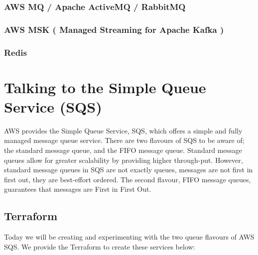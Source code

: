 \documentclass{csse4400}
\begin{document}
\subsubsection{AWS MQ / Apache ActiveMQ / RabbitMQ}


\subsubsection{AWS MSK ( Managed Streaming for Apache Kafka )}


\subsubsection{Redis}


\section{Talking to the Simple Queue Service (SQS)}

AWS provides the Simple Queue Service, SQS,
which offers a simple and fully managed message queue service.
There are two flavours of SQS to be aware of;
the standard message queue, and the FIFO message queue.
Standard message queues allow for greater scalability by providing higher through-put.
However, standard message queues in SQS are not exactly queues,
messages are not first in first out,
they are best-effort ordered.
The second flavour, FIFO message queues,
guarantees that messages are First in First Out.

\subsection{Terraform}


Today we will be creating and experimenting with the two queue flavours of AWS SQS.
We provide the Terraform to create these services below:

\end{document}
